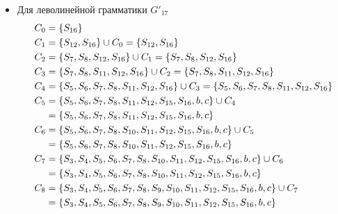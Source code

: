 \begin{itemize}
	\item Для леволинейной грамматики \(G'_{17}\)
	      \begin{align*}
		      C_{0}  & = \cbr{S_{16}}                                                                                                            \\
		      C_{1}  & = \cbr{S_{12}, S_{16}} \cup C_{0} = \cbr{S_{12}, S_{16}}                                                                  \\
		      C_{2}  & = \cbr{S_7, S_8, S_{12}, S_{16}} \cup C_{1} = \cbr{S_7, S_8, S_{12}, S_{16}}                                              \\
		      C_{3}  & = \cbr{S_7, S_8, S_{11}, S_{12}, S_{16}} \cup C_{2} = \cbr{S_7, S_8, S_{11}, S_{12}, S_{16}}                              \\
		      C_{4}  & = \cbr{S_5, S_6, S_7, S_8, S_{11}, S_{12}, S_{16}} \cup C_{3} = \cbr{S_5, S_6, S_7, S_8, S_{11}, S_{12}, S_{16}}          \\
		      C_{5}  & = \cbr{S_5, S_6, S_7, S_8, S_{11}, S_{12}, S_{15}, S_{16}, b, c} \cup C_{4}                                               \\
		             & = \cbr{S_5, S_6, S_7, S_8, S_{11}, S_{12}, S_{15}, S_{16}, b, c}                                                          \\
		      C_{6}  & = \cbr{S_5, S_6, S_7, S_8, S_{10}, S_{11}, S_{12}, S_{15}, S_{16}, b, c} \cup C_{5}                                       \\
		             & = \cbr{S_5, S_6, S_7, S_8, S_{10}, S_{11}, S_{12}, S_{15}, S_{16}, b, c}                                                  \\
		      C_{7}  & = \cbr{S_3, S_4, S_5, S_6, S_7, S_8, S_{10}, S_{11}, S_{12}, S_{15}, S_{16}, b, c} \cup C_{6}                             \\
		             & = \cbr{S_3, S_4, S_5, S_6, S_7, S_8, S_{10}, S_{11}, S_{12}, S_{15}, S_{16}, b, c}                                        \\
		      C_{8}  & = \cbr{S_3, S_4, S_5, S_6, S_7, S_8, S_9, S_{10}, S_{11}, S_{12}, S_{15}, S_{16}, b, c} \cup C_{7}                        \\
		             & = \cbr{S_3, S_4, S_5, S_6, S_7, S_8, S_9, S_{10}, S_{11}, S_{12}, S_{15}, S_{16}, b, c}                                   \\

\end{align*}
\end{itemize}
